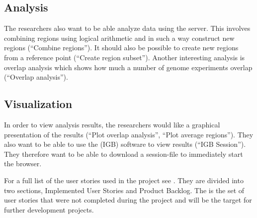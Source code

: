 \subsection{Analysis}
The researchers also want to be able analyze data using the server. This involves combining regions using logical arithmetic and in such a way construct new regions (``Combine regions''). It should also be possible to create new regions from a reference point (``Create region subset''). Another interesting analysis is overlap analysis which shows how much a number of genome experiments overlap (``Overlap analysis'').

\subsection{Visualization}
In order to view analysis results, the researchers would like a graphical presentation of the results (``Plot overlap analysis'', ``Plot average regions''). They also want to be able to use the  (IGB)\cite{IGB} software to view results (``IGB Session''). They therefore want to be able to download a session-file to immediately start the browser.

For a full list of the user stories used in the project see . They are divided into two sections, Implemented User Stories and Product Backlog. The  is the set of user stories that were not completed during the project and will be the target for further development projects.
